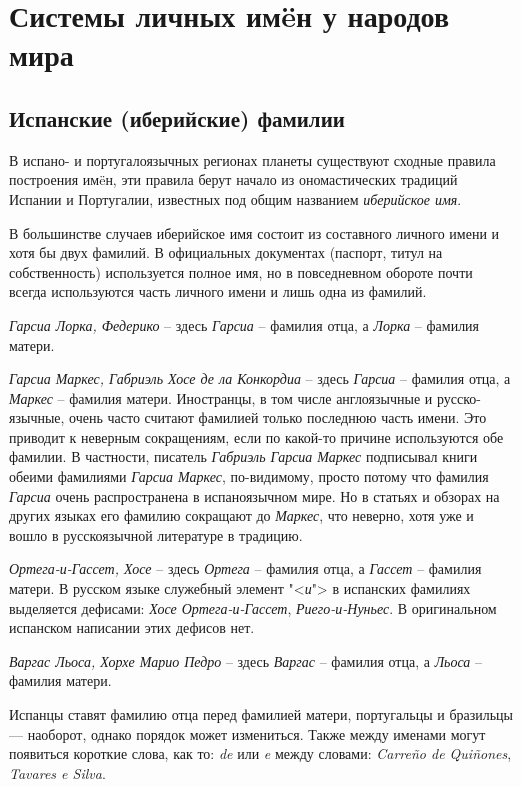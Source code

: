 \chapter{Системы личных им\"eн у народов мира}

\section{Испанские (иберийские) фамилии}

В испано- и португалоязычных регионах планеты существуют сходные правила построения им\"eн, эти правила берут начало из ономастических традиций Испании и Португалии, известных под общим названием \emph{иберийское имя}.

В большинстве случаев иберийское имя состоит из составного личного имени и хотя бы двух фамилий. В официальных документах (паспорт, титул на собственность) используется полное имя, но в повседневном обороте почти всегда используются часть личного имени и лишь одна из фамилий.

\emph{Гарсиа Лорка, Федерико} -- здесь \emph{Гарсиа} -- фамилия отца, а \emph{Лорка} -- фамилия матери.

\emph{Гарсиа Маркес, Габриэль Хосе де ла Конкордиа} -- здесь \emph{Гарсиа} -- фамилия отца, а \emph{Маркес} -- фамилия матери. Иностранцы, в том числе англоязычные и русско-язычные, очень часто считают фамилией только последнюю часть имени. Это приводит к неверным сокращениям, если по какой-то причине используются обе фамилии. В частности, писатель \emph{Габриэль Гарсиа Маркес} подписывал книги обеими фамилиями \emph{Гарсиа Маркес}, по-видимому, просто потому что фамилия \emph{Гарсиа} очень распространена в испаноязычном мире. Но в статьях и обзорах на других языках его фамилию сокращают до \emph{Маркес}, что неверно, хотя уже и вошло в русскоязычной литературе в традицию.

\emph{Ортега-и-Гассет, Хосе} -- здесь \emph{Ортега} -- фамилия отца, а \emph{Гассет} -- фамилия матери. В русском языке служебный элемент "<\emph{и}"> в испанских фамилиях выделяется дефисами: \emph{Хосе Ортега-и-Гассет}, \emph{Риего-и-Нуньес}. В оригинальном испанском написании этих дефисов нет.

\emph{Варгас Льоса, Хорхе Марио Педро} -- здесь \emph{Варгас} -- фамилия отца, а \emph{Льоса} -- фамилия матери.

Испанцы ставят фамилию отца перед фамилией матери, португальцы и бразильцы — наоборот, однако порядок может измениться. Также между именами могут появиться короткие слова, как то: \emph{de} или \emph{e} между словами: \emph{Carre\~no de Qui\~nones}, \emph{Tavares e Silva}.

